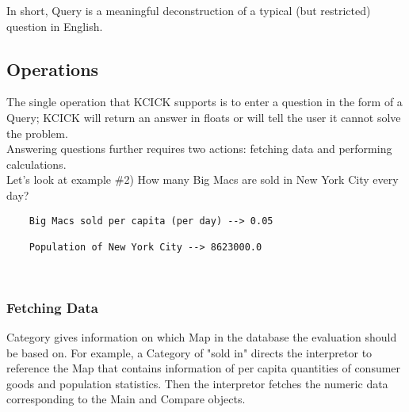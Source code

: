 \documentclass{article}
\begin{document}
In short, Query is a meaningful deconstruction of a typical (but restricted) question in English. 


\subsection{Operations} 
The single operation that KCICK supports is to enter a question in the form of a Query; KCICK will return an answer in floats or will tell the user it cannot solve the problem.\\

Answering questions further requires two actions: fetching data and performing calculations.\\

Let's look at example \#2) How many Big Macs are sold in New York City every day?\\

\begin{verbatim} 
    Big Macs sold per capita (per day) --> 0.05
    
    Population of New York City --> 8623000.0
    
    
\end{verbatim}
\subsubsection{Fetching Data}

Category gives information on which Map in the database the evaluation should be based on. For example, a Category of "sold in" directs the interpretor to reference the Map that contains information of  per capita quantities of consumer goods and population statistics. Then the interpretor fetches the numeric data corresponding to the Main and Compare objects.\\
\end{document}
